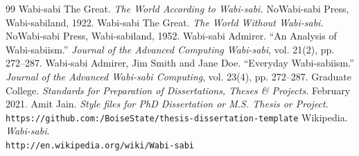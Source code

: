 \documentclass[dissertation, proposal]{bsu-cs}  %
\begin{document}
%
%


% 

%
%



\begin{thebibliography}{99} 
\label{references}
 Wabi-sabi The Great. \emph{The World According to Wabi-sabi.} NoWabi-sabi
Press, Wabi-sabiland, 1922.
 Wabi-sabi The Great. \emph{The World Without Wabi-sabi.} NoWabi-sabi
Press, Wabi-sabiland, 1952.
 Wabi-sabi Admirer. ``An Analysis of Wabi-sabiism.'' \emph{Journal of the
Advanced Computing Wabi-sabi}, vol. 21(2), pp. 272--287.
 Wabi-sabi Admirer, Jim Smith and Jane Doe. ``Everyday
Wabi-sabiism.'' \emph{Journal of the Advanced Wabi-sabi Computing}, vol. 23(4), pp. 272--287.
 Graduate College. \emph{Standards for Preparation of Dissertations, Theses \&
Projects.} February 2021.
 Amit Jain. \emph{Style files for PhD Dissertation or M.S. Thesis or Project}.\\
\texttt{https://github.com:/BoiseState/thesis-dissertation-template}
 Wikipedia. \emph{Wabi-sabi}.\\
\texttt{http://en.wikipedia.org/wiki/Wabi-sabi}
\end{thebibliography}


%
%
\end{document}
